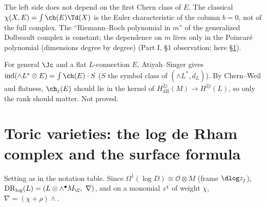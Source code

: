 \begin{rem}[Meaning\ \tP]
The left side does not depend on the first Chern class of $E$. The classical $\chi(X,E)=\int\ch(E)\Td(X)$ is the Euler characteristic of the column $b=0$, not of the full complex. The ``Riemann--Roch polynomial in $m$'' of the generalized Dolbeault complex is constant; the dependence on $m$ lives only in the Poincar\'e polynomial (dimensions degree by degree) (Part I, \S1 observation; here \S\ref{sec:toric}).
\end{rem}
\begin{rem}
For general $\Jc$ and a flat $L$-connection $E$, Atiyah--Singer gives $\mathrm{ind}(\wedge L^*\otimes E)=\int\ch(E)\cdot S$ ($S$ the symbol class of $(\wedge L^*,d_L)$). By Chern--Weil and flatness, $\ch_j(E)$ should lie in the kernel of $H^{2j}_{dR}(M)\to H^{2j}(L)$, so only the rank should matter. Not proved.
\end{rem}

\section{Toric varieties: the log de Rham complex and the surface formula}\label{sec:toric}
Setting as in the notation table. Since $\Omega^1(\log D)\cong\mathcal O\otimes M$ (frame $\dlog z_j$), $\mathrm{DR}_{\log}(L)=(L\otimes\wedge^\bullet M_\C,\ \nabla)$, and on a monomial $z^\chi$ of weight $\chi$, $\nabla=(\chi+\rho)\wedge$.

